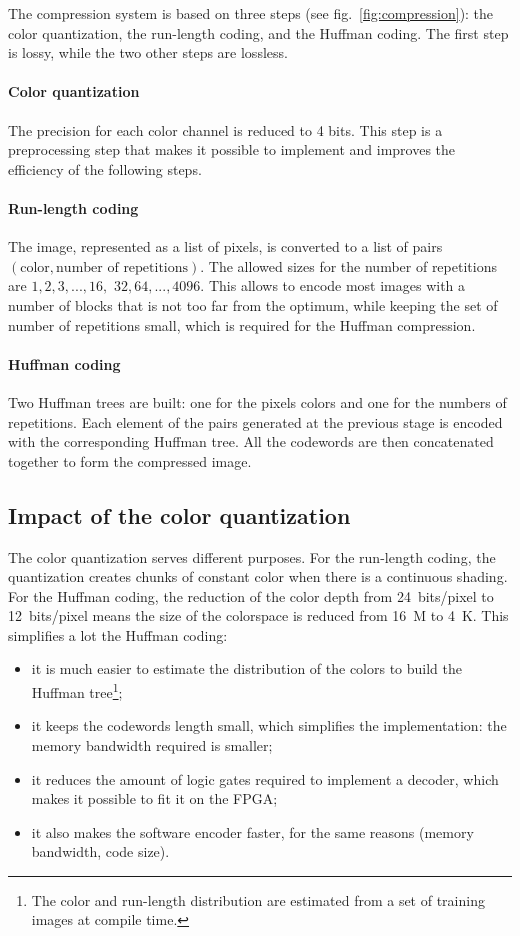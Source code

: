 \documentclass[english, DIV=13]{scrartcl}
\begin{document}
The compression system is based on three steps (see fig.~\ref{fig:compression}):
the color quantization, the run-length coding, and the Huffman coding. The first
step is lossy, while the two other steps are lossless.

\paragraph{Color quantization} The precision for each color channel is
reduced to 4 bits. This step is a preprocessing step that makes it possible
to implement and improves the efficiency of the following steps.

\paragraph{Run-length coding} The image, represented as a list of pixels,
is converted to a list of pairs $(\text{color}, \text{number of repetitions})$.
The allowed sizes for the number of repetitions are
$1, 2, 3, ..., 16,$ $32, 64, ..., 4096$. This allows to encode most images with
a number of blocks that is not too far from the optimum, while keeping the set
of number of repetitions small, which is required for the Huffman compression.

\paragraph{Huffman coding} Two Huffman trees are built: one for the pixels colors
and one for the numbers of repetitions. Each element of the pairs generated
at the previous stage is encoded with the corresponding Huffman tree.
All the codewords are then concatenated together to form the compressed image.

\subsection{Impact of the color quantization}

The color quantization serves different purposes. For the run-length coding,
the quantization creates chunks of constant color when there is a
continuous shading. For the Huffman
coding, the reduction of the color depth from \SI{24}{bits/pixel} to
\SI{12}{bits/pixel} means the size of the colorspace is reduced from
\SI{16}{M} to \SI{4}{K}. This simplifies a lot the Huffman coding:
\begin{itemize}
    \item it is much easier to estimate the distribution of the colors
    to build the Huffman tree\footnote{The color and run-length distribution are
    estimated from a set of training images at compile time.};
    \item it keeps the codewords length small, which simplifies the implementation:
    the memory bandwidth required is smaller;
    \item it reduces the amount of logic gates required to implement a decoder,
    which makes it possible to fit it on the FPGA;
    \item it also makes the software encoder faster, for the same reasons
    (memory bandwidth, code size).
\end{itemize}
\end{document}
